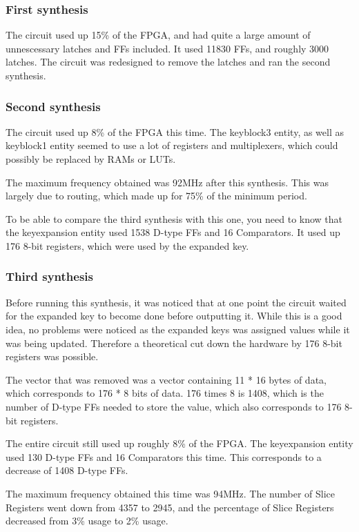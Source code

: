\subsubsection{First synthesis}
The circuit used up 15\% of the FPGA, and had quite a large amount of 
unnescessary latches and FFs included. It used 11830 FFs, and roughly 
3000 latches. The circuit was redesigned to remove the latches and ran 
the second synthesis.

\subsubsection{Second synthesis}
The circuit used up 8\% of the FPGA this time. The keyblock3 entity, as 
well as keyblock1 entity seemed to use a lot of registers and 
multiplexers, which could possibly be replaced by RAMs or LUTs.

The maximum frequency obtained was 92MHz after this synthesis. This 
was largely due to routing, which made up for 75\% of the minimum 
period.

To be able to compare the third synthesis with this one, you need to 
know that the keyexpansion entity used 1538 D-type FFs and 16 
Comparators. It used up 176 8-bit registers, which were used by the 
expanded key.

\subsubsection{Third synthesis}
Before running this synthesis, it was noticed that at one point the 
circuit waited for the expanded key to become done before outputting 
it. While this is a good idea, no problems were noticed as the expanded 
keys was assigned values while it was being updated. Therefore a 
theoretical cut down the hardware by 176 8-bit registers was possible. 

The vector that was removed was a vector containing 11 * 16 bytes of 
data, which corresponds to 176 * 8 bits of data. 176 times 8 is 1408, 
which is the number of D-type FFs needed to store the value, which 
also corresponds to 176 8-bit registers.

The entire circuit still used up roughly 8\% of the FPGA. The 
keyexpansion entity used 130 D-type FFs and 16 Comparators this 
time. This corresponds to a decrease of 1408 D-type FFs.

The maximum frequency obtained this time was 94MHz. The number of 
Slice Registers went down from 4357 to 2945, and the percentage of 
Slice Registers decreased from 3\% usage to 2\% usage.

